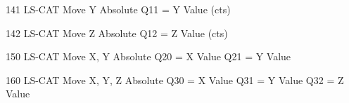 \begin{DoxyPre}141             LS-CAT Move Y Absolute
                        Q11    = Y Value (cts)\end{DoxyPre}



\begin{DoxyPre}142             LS-CAT Move Z Absolute
                        Q12    = Z Value (cts)\end{DoxyPre}



\begin{DoxyPre}150             LS-CAT Move X, Y Absolute
                        Q20    = X Value
                        Q21    = Y Value\end{DoxyPre}



\begin{DoxyPre}160             LS-CAT Move X, Y, Z  Absolute
                        Q30    = X Value
                        Q31    = Y Value
                        Q32    = Z Value
\end{DoxyPre}
 